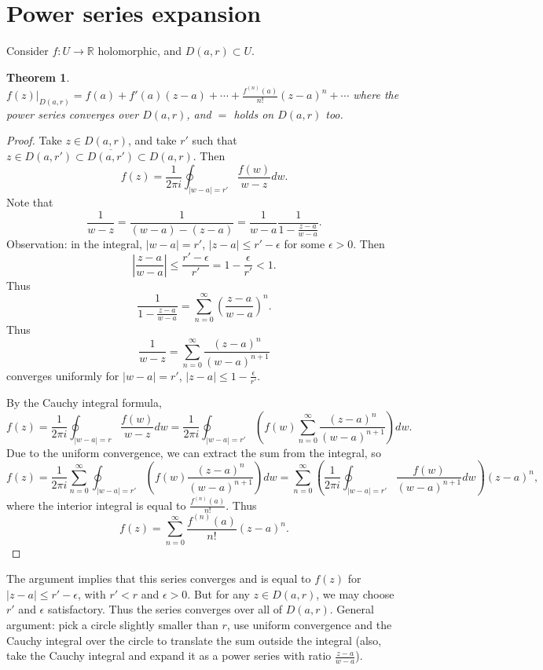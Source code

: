 \documentclass{artikel3}
\date{\formatdate{2012}{04}{18}}
\newcommand{\pr}[1]{\left(#1\right)}
\newcommand{\abs}[1]{\left|#1\right|}
\newcommand{\complex}{\mathbb{R}}
\newtheorem{thm}{Theorem}
\numberwithin{equation}{enumi}
\begin{document}
\section{Power series expansion}
Consider $f:U\to \complex$ holomorphic, and $D(a,r)\subset U$.

\begin{thm}
	$f(z)|_{D(a,r)}=f(a)+f'(a)(z-a)+\cdots +\frac{f^{(n)}(a)}{n!}(z-a)^n+\cdots$
	where the power series converges over $D(a,r)$, and $=$ holds on $D(a,r)$ too.
\end{thm}

\begin{proof}
	Take $z\in D(a,r)$, and take $r'$
	such that $z\in D(a,r')\subset \overline{D(a,r')}\subset D(a,r)$.  Then \[
		f(z)=\frac{1}{2\pi i}\oint_{\abs{w-a}=r'}\frac{f(w)}{w-z}dw.
	\] Note that \[
		\frac{1}{w-z}=\frac{1}{(w-a)-(z-a)}=\frac{1}{w-a}\frac{1}{1-\frac{z-a}{w-a}}.
	\] Observation: in the integral, $\abs{w-a}=r'$, $\abs{z-a}\leq r'-\epsilon$
	for some $\epsilon>0$.  Then \[
		\abs{\frac{z-a}{w-a}}\leq \frac{r'-\epsilon}{r'}=1-\frac{\epsilon}{r'}<1.
	\] Thus \[
		\frac{1}{1-\frac{z-a}{w-a}}=\sum_{n=0}^{\infty}\pr{\frac{z-a}{w-a}}^n.
	\] Thus \[
		\frac{1}{w-z}=\sum_{n=0}^{\infty}\frac{(z-a)^n}{(w-a)^{n+1}}
	\] converges uniformly for $\abs{w-a}=r'$, $\abs{z-a}\leq 1-\frac{\epsilon}{r'}$.

	By the Cauchy integral formula, \[
		f(z)=\frac{1}{2\pi i}\oint_{\abs{w-a}=r}\frac{f(w)}{w-z}dw
		=\frac{1}{2\pi i}\oint_{\abs{w-a}=r'}\pr{f(w)\sum_{n=0}^{\infty}\frac{(z-a)^n}{(w-a)^{n+1}}}dw.
	\] Due to the uniform convergence, we can extract the sum from the integral, so \[
		f(z)=\frac{1}{2\pi i}\sum_{n=0}^{\infty}\oint_{\abs{w-a}=r'}\pr{f(w)\frac{(z-a)^n}{(w-a)^{n+1}}}dw
		= \sum_{n=0}^{\infty}\pr{\frac{1}{2\pi i}\oint_{\abs{w-a}=r'}\frac{f(w)}{(w-a)^{n+1}}dw}(z-a)^n,
	\] where the interior integral is equal to $\frac{f^{(n)}(a)}{n!}$.  Thus \[
		f(z)=\sum_{n=0}^{\infty}\frac{f^{(n)}(a)}{n!}(z-a)^n.
	\]
\end{proof}

The argument implies that this series converges and is equal to $f(z)$ for
$\abs{z-a}\leq r'-\epsilon$, with $r'<r$ and $\epsilon>0$.  But for any $z\in D(a,r)$, we may choose
$r'$ and $\epsilon$ satisfactory.  Thus the series converges over all of $D(a,r)$.
General argument: pick a circle slightly smaller than $r$, use uniform
convergence and the Cauchy integral over the circle to translate the sum
outside the integral (also, take the Cauchy integral and expand it as a power
series with ratio $\frac{z-a}{w-a}$).
\end{document}
